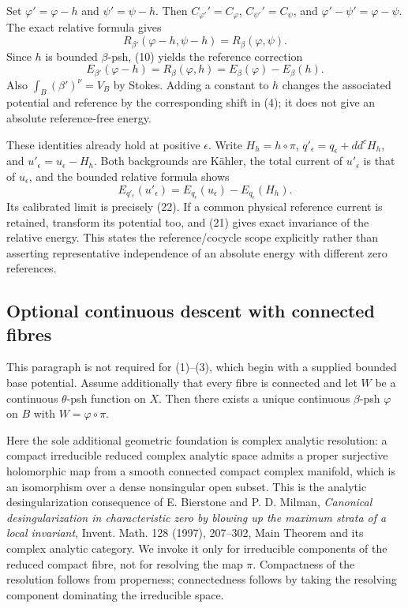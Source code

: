 \documentclass[
  11pt,
]{article}
\begin{document}
Set \(\varphi'=\varphi-h\) and \(\psi'=\psi-h\). Then
\(C_{\varphi'}'=C_\varphi\), \(C_{\psi'}'=C_\psi\), and
\(\varphi'-\psi'=\varphi-\psi\). The exact relative formula gives
\[R_{\beta'}(\varphi-h,\psi-h)=R_\beta(\varphi,\psi). \tag{21}\] Since
\(h\) is bounded \(\beta\)-psh, (10) yields the reference correction
\[E_{\beta'}(\varphi-h)=R_\beta(\varphi,h)
=E_\beta(\varphi)-E_\beta(h). \tag{22}\] Also \(\int_B(\beta')^\nu=V_B\)
by Stokes. Adding a constant to \(h\) changes the associated potential
and reference by the corresponding shift in (4); it does not give an
absolute reference-free energy.

These identities already hold at positive \(\epsilon\). Write
\(H_h=h\circ\pi\), \(q'_\epsilon=q_\epsilon+dd^cH_h\), and
\(u'_\epsilon=u_\epsilon-H_h\). Both backgrounds are Kähler, the total
current of \(u'_\epsilon\) is that of \(u_\epsilon\), and the bounded
relative formula shows \[E_{q'_\epsilon}(u'_\epsilon)
=E_{q_\epsilon}(u_\epsilon)-E_{q_\epsilon}(H_h).\] Its calibrated limit
is precisely (22). If a common physical reference current is retained,
transform its potential too, and (21) gives exact invariance of the
relative energy. This states the reference/cocycle scope explicitly
rather than asserting representative independence of an absolute energy
with different zero references.

\subsection{Optional continuous descent with connected
fibres}\label{optional-continuous-descent-with-connected-fibres}

This paragraph is not required for (1)--(3), which begin with a supplied
bounded base potential. Assume additionally that every fibre is
connected and let \(W\) be a continuous \(\theta\)-psh function on
\(X\). Then there exists a unique continuous \(\beta\)-psh \(\varphi\)
on \(B\) with \(W=\varphi\circ\pi\).

Here the sole additional geometric foundation is complex analytic
resolution: a compact irreducible reduced complex analytic space admits
a proper surjective holomorphic map from a smooth connected compact
complex manifold, which is an isomorphism over a dense nonsingular open
subset. This is the analytic desingularization consequence of E.
Bierstone and P. D. Milman, \emph{Canonical desingularization in
characteristic zero by blowing up the maximum strata of a local
invariant}, Invent. Math. 128 (1997), 207--302, Main Theorem and its
complex analytic category. We invoke it only for irreducible components
of the reduced compact fibre, not for resolving the map \(\pi\).
Compactness of the resolution follows from properness; connectedness
follows by taking the resolving component dominating the irreducible
space.
\end{document}
